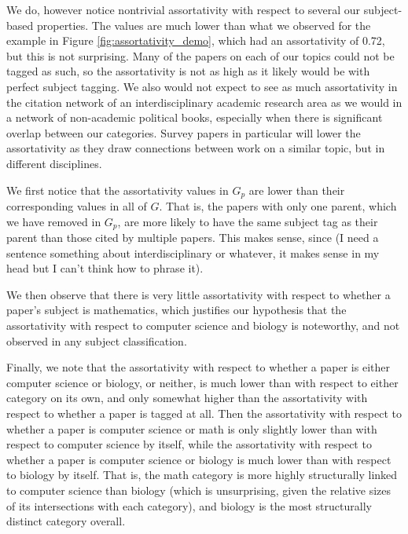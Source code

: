 \documentclass[12pt]{thesis}
\theoremstyle{plain}
\theoremstyle{definition}
\theoremstyle{remark}
\begin{document}
We do, however notice nontrivial assortativity with respect to several our subject-based properties. The values are much lower than what we observed for the example in Figure \ref{fig:assortativity_demo}, which had an assortativity of 0.72, but this is not surprising. Many of the papers on each of our topics could not be tagged as such, so the assortativity is not as high as it likely would be with perfect subject tagging. We also would not expect to see as much assortativity in the citation network of an interdisciplinary academic research area as we would in a network of non-academic political books, especially when there is significant overlap between our categories. Survey papers in particular will lower the assortativity as they draw connections between work on a similar topic, but in different disciplines.

We first notice that the assortativity values in $G_p$ are lower than their corresponding values in all of $G$. That is, the papers with only one parent, which we have removed in $G_p$, are more likely to have the same subject tag as their parent than those cited by multiple papers. This makes sense, since (I need a sentence something about interdisciplinary or whatever, it makes sense in my head but I can't think how to phrase it). 

We then observe that there is very little assortativity with respect to whether a paper's subject is mathematics, which justifies our hypothesis that the assortativity with respect to computer science and biology is noteworthy, and not observed in any subject classification.

Finally, we note that the assortativity with respect to whether a paper is either computer science or biology, or neither, is much lower than with respect to either category on its own, and only somewhat higher than the assortativity with respect to whether a paper is tagged at all. Then the assortativity with respect to whether a paper is computer science or math is only slightly lower than with respect to computer science by itself, while the assortativity with respect to whether a paper is computer science or biology is much lower than with respect to biology by itself. That is, the math category is more highly structurally linked to computer science than biology (which is unsurprising, given the relative sizes of its intersections with each category), and biology is the most structurally distinct category overall. 
\end{document}
